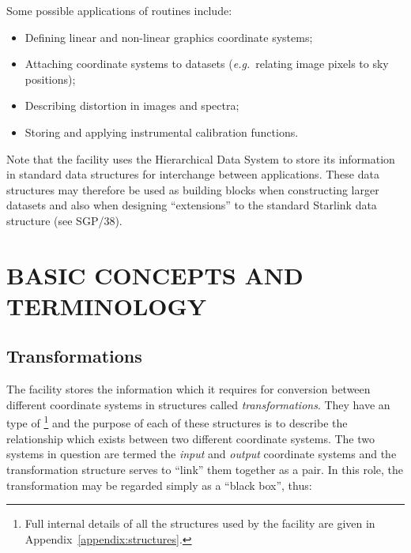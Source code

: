 Some possible applications of  routines include:

\begin{itemize}
\item Defining linear and non-linear graphics coordinate systems;
\item Attaching coordinate systems to datasets ({\em e.g.}\ relating image
pixels to sky positions); 
\item Describing distortion in images and spectra;
\item Storing and applying instrumental calibration functions.
\end{itemize}

Note that the  facility uses the Hierarchical Data System
 to store its information in standard data structures for
interchange between applications. 
These data structures may therefore be used as building blocks when
constructing larger  datasets and also when designing
``extensions'' to the standard Starlink  data structure (see
SGP/38). 


\section{BASIC CONCEPTS AND TERMINOLOGY}


\subsection{Transformations}

The  facility stores the information which it requires for
conversion between different coordinate systems in  structures
called {\em transformations}. 
They have an  type of \footnote{
Full internal details of all the  structures used by the
 facility are given in Appendix~\ref{appendix:structures}.} 
and the purpose of each of these structures is to describe the relationship
which exists between two different coordinate systems. 
The two systems in question are termed the {\em input} and {\em output}
coordinate systems and the  transformation structure serves to
``link'' them together as a pair. 
In this role, the transformation may be regarded simply as a ``black box'',
thus: 

